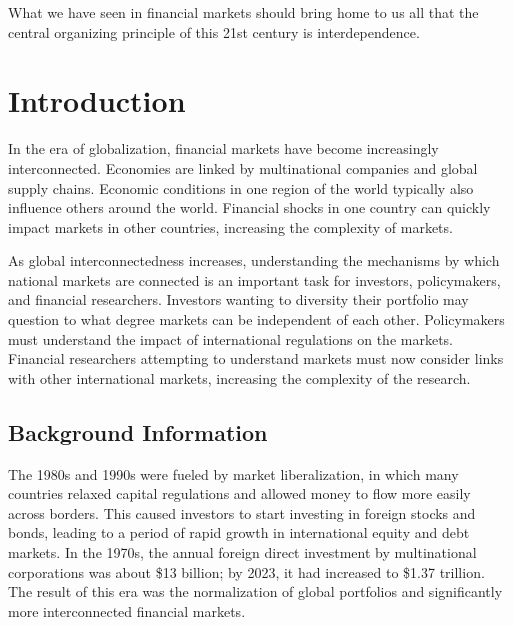 \begin{savequote}[75mm]
What we have seen in financial markets should bring home to us all that the central organizing principle of this 21st century is interdependence.
\end{savequote}

\chapter{Introduction}

In the era of globalization, financial markets have become increasingly interconnected. Economies are linked by multinational companies and global supply chains. Economic conditions in one region of the world typically also influence others around the world. Financial shocks in one country can quickly impact markets in other countries, increasing the complexity of markets.

As global interconnectedness increases, understanding the mechanisms by which national markets are connected is an important task for investors, policymakers, and financial researchers. Investors wanting to diversity their portfolio may question to what degree markets can be independent of each other. Policymakers must understand the impact of international regulations on the markets. Financial researchers attempting to understand markets must now consider links with other international markets, increasing the complexity of the research.

\section{Background Information}

The 1980s and 1990s were fueled by market liberalization, in which many countries relaxed capital regulations and allowed money to flow more easily across borders.\cite{followingthemoney} This caused investors to start investing in foreign stocks and bonds, leading to a period of rapid growth in international equity and debt markets.\cite{followingthemoney} In the 1970s, the annual foreign direct investment by multinational corporations was about \$13 billion; by 2023, it had increased to \$1.37 trillion. The result of this era was the normalization of global portfolios and significantly more interconnected financial markets.

